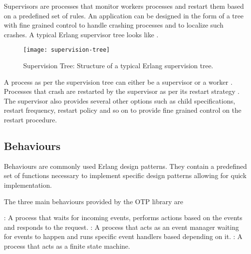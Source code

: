Supervisors are processes that monitor workers processes and restart them based
on a predefined set of rules. An application can be designed in the form of a
tree with fine grained control to handle crashing processes and to localize such
crashes. A typical Erlang supervisor tree looks like
.

\begin{figure}
  \texttt{[image: supervision-tree]}
  \caption[Supervision Tree]{%
    Supervision Tree: Structure of a typical Erlang supervision tree.}
  \label{figure:supervision.tree}
  \normalcaption
\end{figure}

A process as per the supervision tree can either be a supervisor%
or a worker%
. Processes that crash are restarted by the supervisor as per its
restart strategy%
. The supervisor also provides several other options such as child
specifications, restart frequency, restart policy and so on to provide
fine grained control on the restart procedure.

\subsection{Behaviours}
\label{section:concepts.behaviours}
Behaviours are commonly used Erlang design patterns. They contain a predefined
set of functions necessary to implement specific design patterns allowing for
quick implementation.

The three main behaviours provided by the OTP library are

\begin{itemize}
    : A process that waits for incoming events, performs
    actions based on the events and responds to the request.
    : A process that acts as an event manager waiting for
    events to happen and runs specific event handlers based depending on it.
    : A process that acts as a finite state machine.
\end{itemize}

